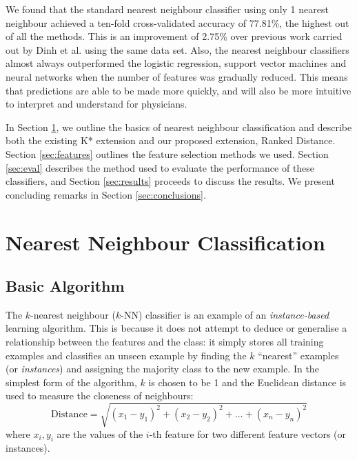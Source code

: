 \documentclass{article}
\begin{document}
We found that the standard nearest neighbour classifier using only 1 nearest
neighbour achieved a ten-fold cross-validated accuracy of 77.81\%, the highest
out of all the methods. This is an improvement of 2.75\% over previous work
carried out by Dinh et al. \citep{Dinh2013a} using the same data set. Also, the
nearest neighbour classifiers almost always outperformed the logistic
regression, support vector machines and neural networks when the number of
features was gradually reduced. This means that predictions are able to be made
more quickly, and will also be more intuitive to interpret and understand for
physicians.

In Section \ref{sec:nn}, we outline the basics of nearest neighbour
classification and describe both the existing K* extension and our proposed
extension, Ranked Distance. Section \ref{sec:features} outlines the feature
selection methods we used. Section \ref{sec:eval} describes the method used
to evaluate the performance of these classifiers, and Section \ref{sec:results}
proceeds to discuss the results. We present concluding remarks in Section
\ref{sec:conclusions}.

\section{Nearest Neighbour Classification}
\label{sec:nn}

\subsection{Basic Algorithm}
The $k$-nearest neighbour ($k$-NN) classifier is an example of an
\textit{instance-based} learning algorithm. This is because it does not attempt
to deduce or
generalise a relationship between the features and the class: it simply stores
all training examples and classifies an unseen example by finding the $k$
``nearest'' examples (or \textit{instances}) and assigning the majority class
to the new example. In the simplest form of the algorithm, $k$ is chosen to be
1 and the Euclidean distance is used to measure the closeness of neighbours:
\begin{equation*}
\mathrm{Distance} = \sqrt{(x_1-y_1)^2 + (x_2-y_2)^2 + \ldots + (x_n-y_n)^2}
\end{equation*}
where $x_i,y_i$ are the values of the $i$-th feature for two different feature
vectors (or instances).
\end{document}
